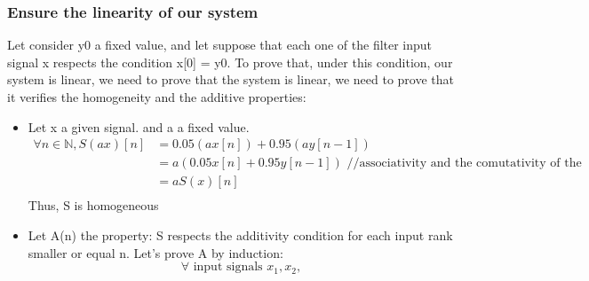 \documentclass[a4paper,10pt]{article}
\begin{document}
	\subsubsection{Ensure the linearity of our system}
	Let consider y0 a fixed value, and let suppose that each one of the filter input signal x respects the condition x[0] = y0.\newline
	To prove that, under this condition, our system is linear, we need to prove that the system is linear, we need to prove that it verifies the homogeneity and the additive properties:
	\begin{itemize}
	    \item
		Let x a given signal. and a a fixed value.\newline
		\begin{equation*}
		\begin{aligned}
		    \forall n \in  \mathbb{N}, S(a x)[n]
		    &= 0.05 (a x[n]) + 0.95 (a y[n-1])\\
		    &= a (0.05 x[n] + 0.95 y[n-1]) \mbox{ //associativity and the comutativity of the multiplication)}\\
		    &= a S(x)[n]\\
		\end{aligned}
		\end{equation*}
		Thus, S is homogeneous
	    \item
		Let A(n) the property: S respects the additivity condition for each input rank smaller or equal n.  Let's prove A by induction:
		\begin{equation} \forall \mbox{ input signals } x_{1}, x_{2}, \end{equation}


\end{itemize}
\end{document}
